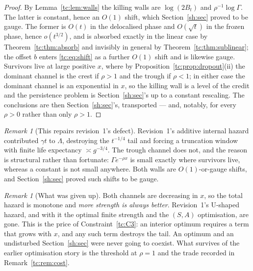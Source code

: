 \documentclass[11pt]{article}
\numberwithin{equation}{section}
\theoremstyle{plain}
\theoremstyle{definition}
\theoremstyle{remark}
\newtheorem{remark}[theorem]{Remark}
\begin{document}
\begin{proof}
By Lemma~\ref{tc:lem:walls} the killing walls are $\log(2B_t)$ and
$\rho^{-1}\log\Gamma$. The latter is constant, hence an $O(1)$ shift,
which Section~\ref{sh:sec} proved to be gauge. The former is $O(t)$ in the
delocalised phase and $O(\sqrt t)$ in the frozen phase, hence
$o(t^{3/2})$, and is absorbed exactly in the linear case by
Theorem~\ref{tc:thm:absorb} and invisibly in general by
Theorem~\ref{tc:thm:sublinear}; the offset $b$ enters
\eqref{tc:eq:shift} as a further $O(1)$ shift and is likewise gauge.
Survivors live at large positive $x$, where by
Proposition~\ref{tc:prop:dropout}(ii) the dominant channel is the crest
if $\rho>1$ and the trough if $\rho<1$; in either case the dominant
channel is an exponential in $x$, so the killing wall is a level of the
credit and the persistence problem is Section~\ref{sh:sec}'s up to a constant
rescaling. The conclusions are then Section~\ref{sh:sec}'s, transported --- and,
notably, for every $\rho>0$ rather than only $\rho>1$.
\end{proof}

\begin{remark}[This repairs revision~1's defect]\label{tc:rem:repair}
Revision~1's additive internal hazard contributed $\gamma t$ to
$\Lambda$, destroying the $t^{-1/4}$ tail and forcing a truncation
window with finite life expectancy $\asymp g^{-3/4}$. The trough channel
does not, and the reason is structural rather than fortunate:
$\Gamma e^{-\rho x}$ is small exactly where survivors live, whereas a
constant is not small anywhere. Both walls are $O(1)$-or-gauge shifts,
and Section~\ref{sh:sec} proved such shifts to be gauge.
\end{remark}

\begin{remark}[What was given up]\label{tc:rem:givenup}
Both channels are decreasing in $x$, so the total hazard is monotone and
\emph{more strength is always better}. Revision~1's U-shaped hazard, and
with it the optimal finite strength and the $(S,A)$ optimisation, are
gone. This is the price of Constraint~\ref{tc:C3}: an interior optimum
requires a term that grows with $x$, and any such term destroys the
tail. An optimum and an undisturbed Section~\ref{sh:sec} were never going to
coexist. What survives of the earlier optimisation story is the
threshold at $\rho=1$ and the trade recorded in
Remark~\ref{tc:rem:cost}.
\end{remark}

\end{document}
